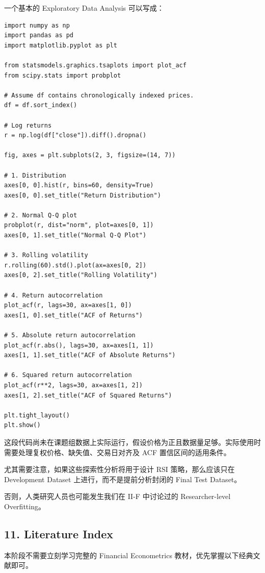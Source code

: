 一个基本的 Exploratory Data Analysis 可以写成：

\begin{verbatim}
import numpy as np
import pandas as pd
import matplotlib.pyplot as plt

from statsmodels.graphics.tsaplots import plot_acf
from scipy.stats import probplot

# Assume df contains chronologically indexed prices.
df = df.sort_index()

# Log returns
r = np.log(df["close"]).diff().dropna()

fig, axes = plt.subplots(2, 3, figsize=(14, 7))

# 1. Distribution
axes[0, 0].hist(r, bins=60, density=True)
axes[0, 0].set_title("Return Distribution")

# 2. Normal Q-Q plot
probplot(r, dist="norm", plot=axes[0, 1])
axes[0, 1].set_title("Normal Q-Q Plot")

# 3. Rolling volatility
r.rolling(60).std().plot(ax=axes[0, 2])
axes[0, 2].set_title("Rolling Volatility")

# 4. Return autocorrelation
plot_acf(r, lags=30, ax=axes[1, 0])
axes[1, 0].set_title("ACF of Returns")

# 5. Absolute return autocorrelation
plot_acf(r.abs(), lags=30, ax=axes[1, 1])
axes[1, 1].set_title("ACF of Absolute Returns")

# 6. Squared return autocorrelation
plot_acf(r**2, lags=30, ax=axes[1, 2])
axes[1, 2].set_title("ACF of Squared Returns")

plt.tight_layout()
plt.show()
\end{verbatim}

这段代码尚未在课题组数据上实际运行，假设价格为正且数据量足够。实际使用时需要处理复权价格、缺失值、交易日对齐及 ACF 置信区间的适用条件。

尤其需要注意，如果这些探索性分析将用于设计 RSI 策略，那么应该只在 Development Dataset 上进行，而不是提前分析封闭的 Final Test Dataset。

否则，人类研究人员也可能发生我们在 II-F 中讨论过的 Researcher-level Overfitting。

\hypertarget{part-4-58-0007-literature-index}{%
\subsection{11. Literature Index}\label{part-4-58-0007-literature-index}}

本阶段不需要立刻学习完整的 Financial Econometrics 教材，优先掌握以下经典文献即可。


